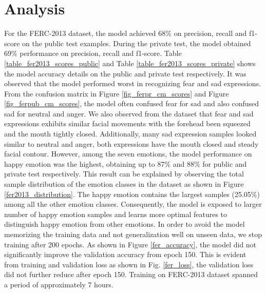 \documentclass[master]{thesis-uestc}
\begin{document}
\section{Analysis}
For the FERC-2013 dataset, the model achieved 68\% on precision, recall and f1-score on the public test examples. During the private test, the model obtained 69\% performance on precision, recall and f1-score. Table \ref{table_fer2013_scores_public} and Table \ref{table_fer2013_scores_private} shows the model accuracy details on the public and private test respectively. It was observed that the model performed worst in recognizing fear and sad expressions. From the confusion matrix in Figure \ref{fig_ferpr_cm_scores} and Figure \ref{fig_ferpub_cm_scores}, the model often confused fear for sad and also confused sad for neutral and anger. We also observed from the dataset that fear and sad expressions exhibits similar facial movements with the forehead been squeezed and the mouth tightly closed. Additionally, many sad expression samples looked similar to neutral and anger, both expressions have the mouth closed and steady facial contour. However, among the seven emotions, the model performance on happy emotion was the highest, obtaining up to 87\% and 88\% for public and private test respectively. This result can be explained by observing the total sample distribution of the emotion classes in the dataset as shown in Figure \ref{fer2013_distribution}. The happy emotion contains the largest samples (25.05\%) among all the other emotion classes. Consequently, the model is exposed to larger number of happy emotion samples and learns more optimal features to distinguish happy emotion from other emotions. In order to avoid the model memorizing the training data and not generalization well on unseen data, we stop training after 200 epochs. As shown in Figure \ref{fer_accuracy}, the model did not significantly improve the validation accuracy from epoch 150. This is evident from training and validation loss as shown in Fig. \ref{fer_loss}, the validation loss did not further reduce after epoch 150. Training on FERC-2013 dataset spanned a period of approximately 7 hours.
\end{document}

